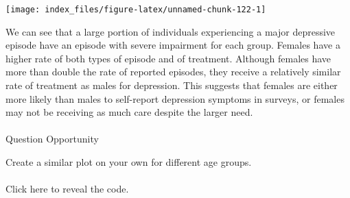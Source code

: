 \documentclass[
]{article}
\begin{document}
\begin{center}\texttt{[image: index\_files/figure-latex/unnamed-chunk-122-1]} \end{center}

We can see that a large portion of individuals experiencing a major
depressive episode have an episode with severe impairment for each
group. Females have a higher rate of both types of episode and of
treatment. Although females have more than double the rate of reported
episodes, they receive a relatively similar rate of treatment as males
for depression. This suggests that females are either more likely than
males to self-report depression symptoms in surveys, or females may not
be receiving as much care despite the larger need.

\hypertarget{section-36}{%
\paragraph{}\label{section-36}}

Question Opportunity

Create a similar plot on your own for different age groups.

\hypertarget{section-37}{%
\paragraph{}\label{section-37}}

Click here to reveal the code.
\end{document}
